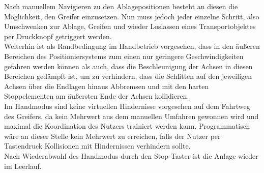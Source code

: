 \documentclass[../../../Bachelorarbeit.tex]{subfiles}
\begin{document}
Nach manuellem Navigieren zu den Ablagepositionen besteht an diesen die Möglichkeit, den Greifer einzusetzen. Nun muss jedoch jeder einzelne Schritt, also Umschwenken zur Ablage, Greifen und wieder Loslassen eines Transportobjektes per Druckknopf getriggert werden.\\
Weiterhin ist als Randbedingung im Handbetrieb vorgesehen, dass in den äußeren Bereichen des Positioniersystems zum einen nur geringere Geschwindigkeiten gefahren werden können als auch, dass die Beschleunigung der Achsen in diesen Bereichen gedämpft ist, um zu verhindern, dass die Schlitten auf den jeweiligen Achsen über die Endlagen hinaus Abbremsen und mit den harten Stoppelementen am äußersten Ende der Achsen kollidieren.\\
Im Handmodus sind keine virtuellen Hindernisse vorgesehen auf dem Fahrtweg des Greifers, da kein Mehrwert aus dem manuellen Umfahren gewonnen wird und maximal die Koordination des Nutzers trainiert werden kann. Programmatisch wäre an dieser Stelle kein Mehrwert zu erreichen, falls der Nutzer per Tastendruck Kollisionen mit Hindernissen verhindern sollte.\\
Nach Wiederabwahl des Handmodus durch den Stop-Taster ist die Anlage wieder im Leerlauf.
\end{document}
